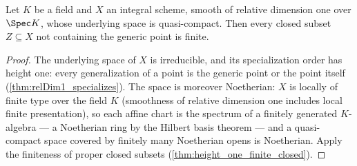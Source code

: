 \begin{theorem}
  \label{thm:curve_finite_closed}
  \leanok
  Let \(K\) be a field and \(X\) an integral scheme, smooth of relative dimension one
  over \(\Spec K\), whose underlying space is quasi-compact. Then every closed subset
  \(Z \subseteq X\) not containing the generic point is finite.
\end{theorem}
\begin{proof}
  \leanok
  The underlying space of \(X\) is irreducible, and its specialization order has height
  one: every generalization of a point is the generic point or the point itself
  (\ref{thm:relDim1_specializes}). The space is moreover Noetherian: \(X\) is locally of
  finite type over the field \(K\) (smoothness of relative dimension one includes local
  finite presentation), so each affine chart is the spectrum of a finitely generated
  \(K\)-algebra --- a Noetherian ring by the Hilbert basis theorem --- and a
  quasi-compact space covered by finitely many Noetherian opens is Noetherian. Apply
  the finiteness of proper closed subsets (\ref{thm:height_one_finite_closed}).
\end{proof}

